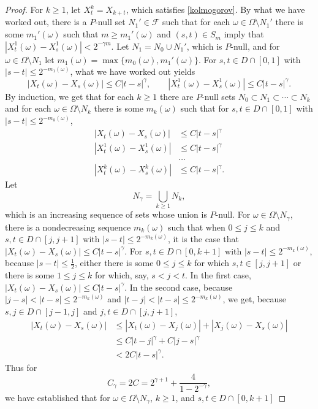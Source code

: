\documentclass{article}
\theoremstyle{definition}
\begin{document}
\begin{proof}
For $k \geq 1$, let $X^k_t=X_{k+t}$, which satisfies \eqref{kolmogorov}. 
By what we have worked out, 
there is a $P$-null set $N_1' \in \mathscr{F}$ such that for each
$\omega \in \Omega \setminus N_1'$ there is some $m_1'(\omega)$ such that
$m \geq m_1'(\omega)$ and $(s,t) \in S_m$ imply that $|X^1_t(\omega)-X^1_s(\omega)|
<2^{-\gamma m}$. 
Let $N_1=N_0 \cup N_1'$, which is $P$-null, and for
$\omega \in \Omega \setminus N_1$ let $m_1(\omega)=\max\{m_0(\omega),m_1'(\omega)\}$. 
For $s,t \in D \cap [0,1]$ with $|s-t| \leq 2^{-m_1(\omega)}$, what we have worked out yields
\[
|X_t(\omega)-X_s(\omega)| \leq C|t-s|^\gamma, \qquad 
|X^1_t(\omega)-X^1_s(\omega)| \leq C|t-s|^\gamma.
\]
By induction, we get that for each $k \geq 1$ there are $P$-null sets $N_0 \subset N_1 \subset \cdots \subset N_k$ and for
each $\omega \in \Omega \setminus N_k$ there is some $m_k(\omega)$ such that
for $s,t \in D \cap [0,1]$ with $|s-t| \leq 2^{-m_k(\omega)}$,
\begin{align*}
|X_t(\omega)-X_s(\omega)| &\leq C|t-s|^\gamma\\
|X^1_t(\omega)-X^1_s(\omega)|&\leq C|t-s|^\gamma\\
&\ldots\\
|X^k_t(\omega)-X^k_s(\omega)|&\leq C|t-s|^\gamma.
\end{align*}
Let
\[
N_\gamma=\bigcup_{k \geq 1} N_k,
\]
 which is an increasing sequence of sets whose union is $P$-null. For $\omega \in \Omega \setminus N_\gamma$,
there is a nondecreasing sequence $m_k(\omega)$ such that when
$0 \leq j \leq k$ and  $s,t \in D \cap [j,j+1]$ with
$|s-t| \leq 2^{-m_k(\omega)}$, it is the case that $|X_t(\omega)-X_s(\omega)| \leq C|t-s|^\gamma$. 
For $s,t \in D \cap [0,k+1]$ with $|s-t| \leq 2^{-m_k(\omega)}$, 
because $|s-t| \leq \frac{1}{2}$, either there is some $0 \leq j \leq k$ for which 
$s,t \in [j,j+1]$ or there is some $1 \leq j \leq k$ for which, say, $s<j<t$. In the first case,
$|X_t(\omega)-X_s(\omega)| \leq C|t-s|^\gamma$.  In the second case, 
because $|j-s|<|t-s| \leq 2^{-m_k(\omega)}$ and $|t-j| < |t-s| \leq 2^{-m_k(\omega)}$, we get, because $s,j \in D \cap [j-1,j]$
and
$j,t \in D \cap [j,j+1]$,
\begin{align*}
|X_t(\omega)-X_s(\omega)|&\leq |X_t(\omega)-X_j(\omega)| + |X_j(\omega)-X_s(\omega)|\\
&\leq C|t-j|^\gamma+C|j-s|^\gamma\\
&< 2C|t-s|^\gamma. 
\end{align*}
Thus for
\[
C_\gamma=2C =  2^{\gamma+1}+\frac{4}{1-2^{-\gamma}},
\]
we have established that for $\omega \in \Omega \setminus N_\gamma$, $k \geq 1$, and $s,t \in D \cap [0,k+1]$

\end{proof}
\end{document}
